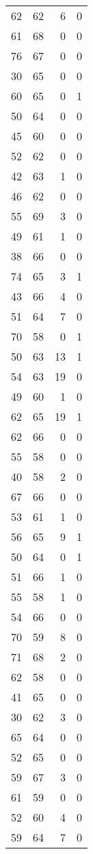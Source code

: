 \begin{tabular}{rrrr}
 62 &  62 &  6 &  0 \\
 61 &  68 &  0 &  0 \\
 76 &  67 &  0 &  0 \\
 30 &  65 &  0 &  0 \\
 60 &  65 &  0 &  1 \\
 50 &  64 &  0 &  0 \\
 45 &  60 &  0 &  0 \\
 52 &  62 &  0 &  0 \\
 42 &  63 &  1 &  0 \\
 46 &  62 &  0 &  0 \\
 55 &  69 &  3 &  0 \\
 49 &  61 &  1 &  0 \\
 38 &  66 &  0 &  0 \\
 74 &  65 &  3 &  1 \\
 43 &  66 &  4 &  0 \\
 51 &  64 &  7 &  0 \\
 70 &  58 &  0 &  1 \\
 50 &  63 & 13 &  1 \\
 54 &  63 & 19 &  0 \\
 49 &  60 &  1 &  0 \\
 62 &  65 & 19 &  1 \\
 62 &  66 &  0 &  0 \\
 55 &  58 &  0 &  0 \\
 40 &  58 &  2 &  0 \\
 67 &  66 &  0 &  0 \\
 53 &  61 &  1 &  0 \\
 56 &  65 &  9 &  1 \\
 50 &  64 &  0 &  1 \\
 51 &  66 &  1 &  0 \\
 55 &  58 &  1 &  0 \\
 54 &  66 &  0 &  0 \\
 70 &  59 &  8 &  0 \\
 71 &  68 &  2 &  0 \\
 62 &  58 &  0 &  0 \\
 41 &  65 &  0 &  0 \\
 30 &  62 &  3 &  0 \\
 65 &  64 &  0 &  0 \\
 52 &  65 &  0 &  0 \\
 59 &  67 &  3 &  0 \\
 61 &  59 &  0 &  0 \\
 52 &  60 &  4 &  0 \\
 59 &  64 &  7 &  0 \\

\end{tabular}
